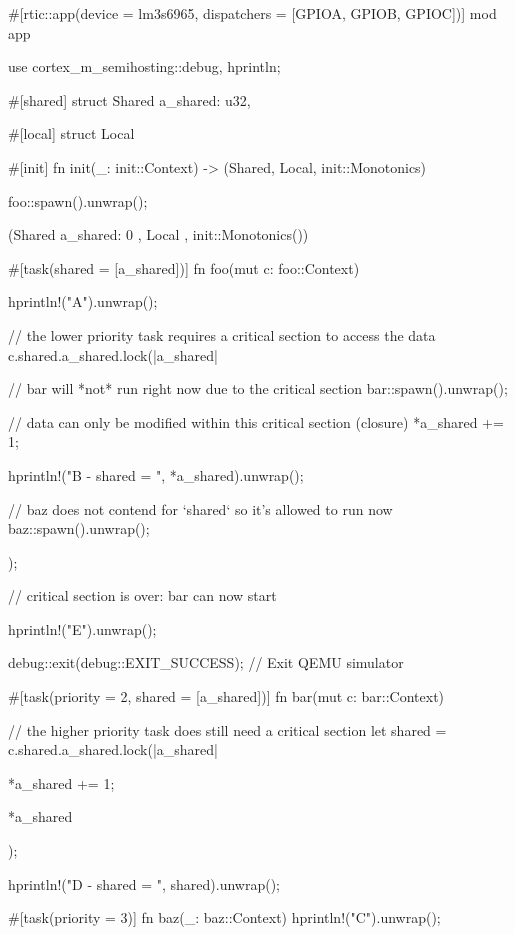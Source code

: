 #[rtic::app(device = lm3s6965, dispatchers = [GPIOA, GPIOB, GPIOC])]
mod app {
    use cortex_m_semihosting::{debug, hprintln};

    #[shared]
    struct Shared {
        a_shared: u32,
    }

    #[local]
    struct Local {}

    #[init]
    fn init(_: init::Context) -> (Shared, Local, init::Monotonics) {
        foo::spawn().unwrap();

        (Shared { a_shared: 0 }, Local {}, init::Monotonics())
    }

    #[task(shared = [a_shared])]
    fn foo(mut c: foo::Context) {
        hprintln!("A").unwrap();

        // the lower priority task requires a critical section to access the data
        c.shared.a_shared.lock(|a_shared| {

            // bar will *not* run right now due to the critical section
            bar::spawn().unwrap(); 

            // data can only be modified within this critical section (closure)
            *a_shared += 1; 


            hprintln!("B - shared = {}", *a_shared).unwrap();

            // baz does not contend for `shared` so it's allowed to run now
            baz::spawn().unwrap();
        });

        // critical section is over: bar can now start

        hprintln!("E").unwrap();

        debug::exit(debug::EXIT_SUCCESS); // Exit QEMU simulator
    }

    #[task(priority = 2, shared = [a_shared])]
    fn bar(mut c: bar::Context) {
        // the higher priority task does still need a critical section
        let shared = c.shared.a_shared.lock(|a_shared| {
            *a_shared += 1;

            *a_shared
        });

        hprintln!("D - shared = {}", shared).unwrap();
    }

    #[task(priority = 3)]
    fn baz(_: baz::Context) {
        hprintln!("C").unwrap();
    }
}
